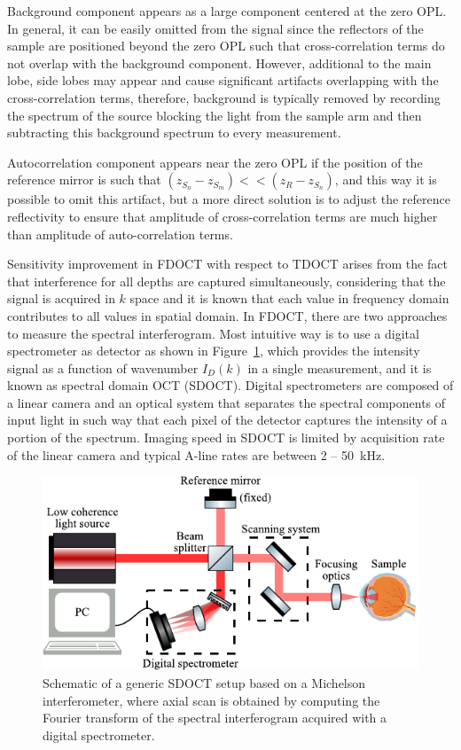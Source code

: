 Background component appears as a large component centered at the zero OPL. In general, it can be easily omitted from the signal since the reflectors of the sample are positioned beyond the zero OPL such that cross-correlation terms do not overlap with the background component. However, additional to the main lobe, side lobes may appear and cause significant artifacts overlapping with the cross-correlation terms, therefore, background is typically removed by recording the spectrum of the source blocking the light from the sample arm and then subtracting this background spectrum to every measurement.

Autocorrelation component appears near the zero OPL if the position of the reference mirror is such that $(z_{S_n}-z_{S_m}) << (z_R-z_{S_n})$, and this way it is possible to omit this artifact, but a more direct solution is to adjust the reference reflectivity to ensure that amplitude of cross-correlation terms are much higher than amplitude of auto-correlation terms.

Sensitivity improvement in FDOCT with respect to TDOCT arises from the fact that interference for all depths are captured simultaneously, considering that the signal is acquired in $k$ space and it is known that each value in frequency domain contributes to all values in spatial domain. In FDOCT, there are two approaches to measure the spectral interferogram. Most intuitive way is to use a digital spectrometer as detector as shown in Figure~\ref{fig:SDOCT_Scheme}, which provides the intensity signal as a function of wavenumber $I_D(k)$ in a single measurement, and it is known as spectral domain OCT (SDOCT). Digital spectrometers are composed of a linear camera and an optical system that separates the spectral components of input light in such way that each pixel of the detector captures the intensity of a portion of the spectrum. Imaging speed in SDOCT is limited by acquisition rate of the linear camera and typical A-line rates are between 2 -- 50~kHz.

\begin{figure}
    \centering
    \includegraphics[width=.75\textwidth]{Figures/TheoreticalBasis/SDOCT_Scheme.pdf}
    \caption{Schematic of a generic SDOCT setup based on a Michelson interferometer, where axial scan is obtained by computing the Fourier transform of the spectral interferogram acquired with a digital spectrometer.}
    \label{fig:SDOCT_Scheme}
\end{figure}

